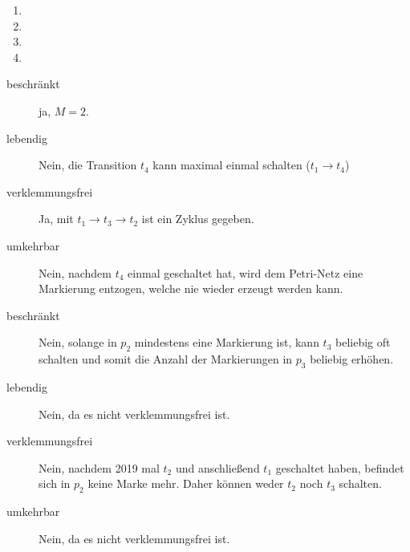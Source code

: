 \documentclass{lehramt-informatik-aufgabe}
\begin{document}
\begin{enumerate}
\item {}
\item {}
\item {}
\item {}

\end{enumerate}

\begin{liAntwort}


\tikzset{/petri/.cd,x=2,y=2,scale=0.45}

\noindent
{}
%
%
%

\begin{description}
\item[beschränkt] ja, $M = 2$.

\item[lebendig] Nein, die Transition $t_4$ kann maximal einmal schalten
(\zB $t_1 \rightarrow t_4$)

\item[verklemmungsfrei] Ja, mit $t_1 \rightarrow t_3 \rightarrow  t_2$
ist ein Zyklus gegeben.

\item[umkehrbar] Nein, nachdem $t_4$ einmal geschaltet hat, wird dem
Petri-Netz eine Markierung entzogen, welche nie wieder erzeugt werden
kann.
\end{description}


\begin{description}
\item[beschränkt] Nein, solange in $p_2$ mindestens eine Markierung ist,
kann $t_3$ beliebig oft schalten und somit die Anzahl der Markierungen
in $p_3$ beliebig erhöhen.

\item[lebendig] Nein, da es nicht verklemmungsfrei ist.

\item[verklemmungsfrei] Nein, nachdem 2019 mal $t_2$ und anschließend
$t_1$ geschaltet haben, befindet sich in $p_2$ keine Marke mehr. Daher
können weder $t_2$ noch $t_3$ schalten.

\item[umkehrbar]
Nein, da es nicht verklemmungsfrei ist.
\end{description}


\end{liAntwort}
\end{document}

